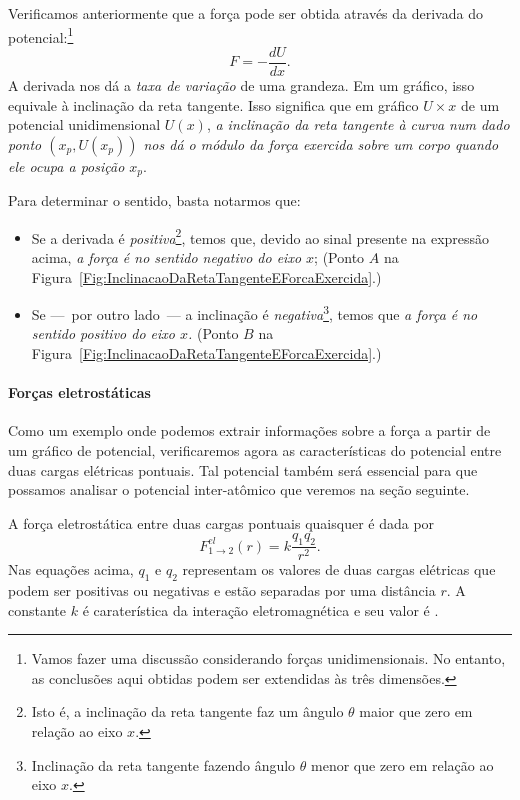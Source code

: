 Verificamos anteriormente que a força pode ser obtida através da derivada do potencial:\footnote[][1cm]{Vamos fazer uma discussão considerando forças unidimensionais. No entanto, as conclusões aqui obtidas podem ser extendidas às três dimensões.}
\begin{equation*}
    F = -\frac{dU}{dx}.
\end{equation*}
%
A derivada nos dá a \emph{taxa de variação} de uma grandeza. Em um gráfico, isso equivale à inclinação da reta tangente. Isso significa que em gráfico $U \times x$ de um potencial unidimensional $U(x)$, \emph{a inclinação da reta tangente à curva num dado ponto $(x_p, U(x_p))$ nos dá o módulo da força exercida sobre um corpo quando ele ocupa a posição $x_p$}.

Para determinar o sentido, basta notarmos que:
\begin{itemize}
    \item Se a derivada é \emph{positiva}\footnote{Isto é, a inclinação da reta tangente faz um ângulo $\theta$ maior que zero em relação ao eixo $x$.}, temos que, devido ao sinal presente na expressão acima, \emph{a força é no sentido negativo do eixo $x$}; (Ponto $A$ na Figura~\ref{Fig:InclinacaoDaRetaTangenteEForcaExercida}.)
    \item Se ---~por outro lado~--- a inclinação é \emph{negativa}\footnote{Inclinação da reta tangente fazendo ângulo $\theta$ menor que zero em relação ao eixo $x$.}, temos que \emph{a força é no sentido positivo do eixo $x$.} (Ponto $B$ na Figura~\ref{Fig:InclinacaoDaRetaTangenteEForcaExercida}.)
\end{itemize}


\paragraph{Forças eletrostáticas}

Como um exemplo onde podemos extrair informações sobre a força a partir de um gráfico de potencial, verificaremos agora as características do potencial entre duas cargas elétricas pontuais. Tal potencial também será essencial para que possamos analisar o potencial inter-atômico que veremos na seção seguinte.

A força eletrostática entre duas cargas pontuais quaisquer é dada por
\begin{equation}
    F_{1\to 2}^{el}(r) = k \frac{q_1 q_2}{r^2}.
\end{equation}
%
Nas equações acima, $q_1$ e $q_2$ representam os valores de duas cargas elétricas que podem ser positivas ou negativas e estão separadas por uma distância $r$. A constante $k$ é caraterística da interação eletromagnética e seu valor é .

